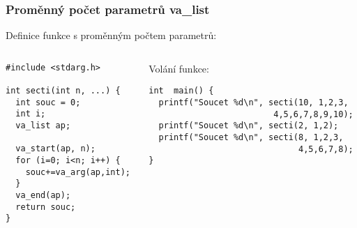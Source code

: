 \documentclass{beamer}
\begin{document}
\begin{frame}[fragile]
\frametitle{Proměnný počet parametrů va\_list}

Definice funkce s proměnným počtem parametrů:

\begin{columns}
\begin{column}{0.4\textwidth}
\begin{verbatim}
#include <stdarg.h>

int secti(int n, ...) {
  int souc = 0;
  int i;
  va_list ap;
  
  va_start(ap, n);
  for (i=0; i<n; i++) {
    souc+=va_arg(ap,int);
  }
  va_end(ap);
  return souc;
}
\end{verbatim}
\end{column}   
\begin{column}{0.6\textwidth}
Volání funkce:

\begin{verbatim}
int  main() {
  printf("Soucet %d\n", secti(10, 1,2,3,
                         4,5,6,7,8,9,10);
  printf("Soucet %d\n", secti(2, 1,2);
  printf("Soucet %d\n", secti(8, 1,2,3,
                              4,5,6,7,8);
}
\end{verbatim}
\end{column}
\end{columns}

\end{frame}
\end{document}
